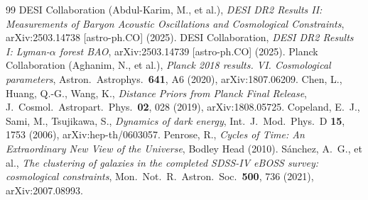 \documentclass[11pt,a4paper]{article}
\begin{document}
\begin{thebibliography}{99}
 DESI Collaboration (Abdul-Karim, M., et al.), \textit{DESI DR2 Results II: Measurements of Baryon Acoustic Oscillations and Cosmological Constraints}, arXiv:2503.14738 [astro-ph.CO] (2025).
 DESI Collaboration, \textit{DESI DR2 Results I: Lyman-$\alpha$ forest BAO}, arXiv:2503.14739 [astro-ph.CO] (2025).
 Planck Collaboration (Aghanim, N., et al.), \textit{Planck 2018 results. VI. Cosmological parameters}, Astron.\ Astrophys.\ \textbf{641}, A6 (2020), arXiv:1807.06209.
 Chen, L., Huang, Q.-G., Wang, K., \textit{Distance Priors from Planck Final Release}, J.\ Cosmol.\ Astropart.\ Phys.\ \textbf{02}, 028 (2019), arXiv:1808.05725.
 Copeland, E.~J., Sami, M., Tsujikawa, S., \textit{Dynamics of dark energy}, Int.\ J.\ Mod.\ Phys.\ D \textbf{15}, 1753 (2006), arXiv:hep-th/0603057.
 Penrose, R., \textit{Cycles of Time: An Extraordinary New View of the Universe}, Bodley Head (2010).
 Sánchez, A.~G., et al., \textit{The clustering of galaxies in the completed SDSS-IV eBOSS survey: cosmological constraints}, Mon.\ Not.\ R.\ Astron.\ Soc.\ \textbf{500}, 736 (2021), arXiv:2007.08993.
\end{thebibliography}
\end{document}
